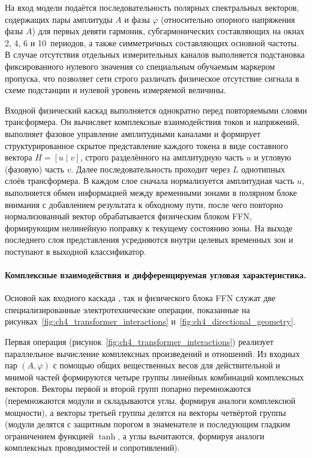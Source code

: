 На вход модели подаётся последовательность полярных спектральных векторов,
содержащих пары амплитуды $A$ и фазы $\varphi$ (относительно опорного
напряжения фазы $A$) для первых девяти гармоник, субгармонических
составляющих на окнах 2, 4, 6 и 10~периодов, а также симметричных
составляющих основной частоты. В случае отсутствия отдельных измерительных
каналов выполняется подстановка фиксированного нулевого значения со
специальным обучаемым маркером пропуска, что позволяет сети строго
различать физическое отсутствие сигнала в схеме подстанции и нулевой
уровень измеряемой величины.

Входной физический каскад  выполняется однократно перед
повторяемыми слоями трансформера. Он вычисляет комплексные взаимодействия
токов и напряжений, выполняет фазовое управление амплитудными каналами и
формирует структурированное скрытое представление каждого токена в виде
составного вектора $H = [u \mid v]$, строго разделённого на амплитудную
часть $u$ и угловую (фазовую) часть $v$. Далее последовательность
проходит через $L$ однотипных слоёв трансформера. В каждом слое сначала
нормализуется амплитудная часть $u$, выполняется обмен информацией между
временными зонами в полярном блоке внимания с добавлением результата к
обходному пути, после чего повторно нормализованный вектор обрабатывается
физическим блоком FFN, формирующим нелинейную поправку к текущему
состоянию зоны. На выходе последнего слоя представления усредняются внутри
целевых временных зон и поступают в выходной классификатор.

\paragraph{Комплексные взаимодействия и дифференцируемая угловая характеристика.}
Основой как входного каскада , так и физического блока
FFN служат две специализированные электротехнические операции, показанные
на рисунках~\ref{fig:ch4_transformer_interactions}
и~\ref{fig:ch4_directional_geometry}.

Первая операция (рисунок~\ref{fig:ch4_transformer_interactions}) реализует
параллельное вычисление комплексных произведений и отношений. Из входных
пар $(A, \varphi)$ с помощью общих вещественных весов для действительной
и мнимой частей формируются четыре группы линейных комбинаций комплексных
векторов. Векторы первой и второй групп попарно перемножаются (перемножаются
модули и складываются углы, формируя аналоги комплексной мощности), а
векторы третьей группы делятся на векторы четвёртой группы (модули делятся
с защитным порогом в знаменателе и последующим гладким ограничением
функцией $\tanh$, а углы вычитаются, формируя аналоги комплексных
проводимостей и сопротивлений).

